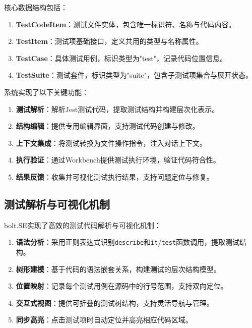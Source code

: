 核心数据结构包括：

\begin{enumerate}
  \item \textbf{TestCodeItem}：测试文件实体，包含唯一标识符、名称与代码内容。
  
  \item \textbf{TestItem}：测试项基础接口，定义共用的类型与名称属性。
  
  \item \textbf{TestCase}：具体测试用例，标识类型为"test"，记录代码位置信息。
  
  \item \textbf{TestSuite}：测试套件，标识类型为"suite"，包含子测试项集合与展开状态。
\end{enumerate}

系统实现了以下关键功能：

\begin{enumerate}
  \item \textbf{测试解析}：解析Jest测试代码，提取测试结构并构建层次化表示。
  
  \item \textbf{结构编辑}：提供专用编辑界面，支持测试代码创建与修改。
  
  \item \textbf{上下文集成}：将测试转换为文件操作指令，注入对话上下文。
  
  \item \textbf{执行验证}：通过Workbench提供测试执行环境，验证代码符合性。
  
  \item \textbf{结果反馈}：收集并可视化测试执行结果，支持问题定位与修复。
\end{enumerate}

\subsection{测试解析与可视化机制}

bolt.SE实现了高效的测试代码解析与可视化机制：

\begin{enumerate}
  \item \textbf{语法分析}：采用正则表达式识别\texttt{describe}和\texttt{it}/\texttt{test}函数调用，提取测试结构。
  
  \item \textbf{树形建模}：基于代码的语法嵌套关系，构建测试的层次结构模型。
  
  \item \textbf{位置映射}：记录每个测试用例在源码中的行号范围，支持双向定位。
  
  \item \textbf{交互式视图}：提供可折叠的测试树结构，支持灵活导航与管理。
  
  \item \textbf{同步高亮}：点击测试项时自动定位并高亮相应代码区域。
\end{enumerate}

